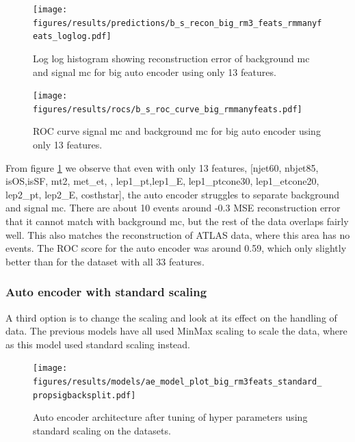 \documentclass[ reprint, amsmath,amssymb, aps, nofootinbib]{revtex4-2}
\begin{document}
\begin{figure}[H]
    \centering
    \texttt{[image: figures/results/predictions/b\_s\_recon\_big\_rm3\_feats\_rmmanyfeats\_loglog.pdf]}
    \caption{Log log histogram showing reconstruction error of background mc and signal mc for big auto encoder using only 13 features. }
    \label{fig:roc_sig_big_13feats}
\end{figure}

\begin{figure}[H]
    \centering
         \texttt{[image: figures/results/rocs/b\_s\_roc\_curve\_big\_rmmanyfeats.pdf]}
         \caption{ROC curve signal mc and background mc for big auto encoder using only 13 features.}
         \label{fig:s_b_big_roc_13}
\end{figure}



From figure \ref{fig:roc_sig_big_13feats} we observe that even with only 13 features, 
[njet60,  nbjet85, isOS,isSF,  mt2, met\_et,  , lep1\_pt,lep1\_E, lep1\_ptcone30, lep1\_etcone20, lep2\_pt,  lep2\_E, costhstar], the auto encoder struggles to separate background and signal mc. There are about 10 events around -0.3 MSE reconstruction error that it cannot match with background mc, but the rest of the data overlaps fairly well. This also matches the reconstruction of ATLAS data, where this area has no events. The ROC score for the auto encoder was around 0.59, which only slightly better than for the dataset with all 33 features. \par

\subsubsection{Auto encoder with standard scaling}

A third option is to change the scaling and look at its effect on the handling of data. The previous models have all used MinMax scaling to scale the data, where as this model used standard scaling instead. 


\begin{figure}[H]
     \centering
         \texttt{[image: figures/results/models/ae\_model\_plot\_big\_rm3feats\_standard\_propsigbacksplit.pdf]}
         \caption{Auto encoder architecture after tuning of hyper parameters using standard scaling on the datasets. }
     \label{fig:ae_big_standard}
\end{figure}
\end{document}
